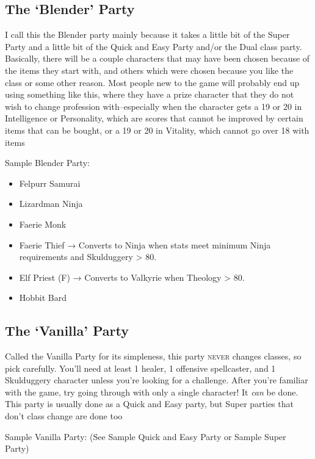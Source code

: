 \documentclass[12pt]{article}
\providecommand{\tightlist}{%
  \setlength{\itemsep}{0pt}\setlength{\parskip}{0pt}}
\begin{document}
\subsection{\texorpdfstring{The `Blender'
Party}{The Blender Party}}\label{the-blender-party}

I call this the Blender party mainly because it takes a little bit of
the Super Party and a little bit of the Quick and Easy Party and/or the
Dual class party. Basically, there will be a couple characters that may
have been chosen because of the items they start with, and others which
were chosen because you like the class or some other reason. Most people
new to the game will probably end up using something like this, where
they have a prize character that they do not wish to change profession
with--especially when the character gets a 19 or 20 in Intelligence or
Personality, which are scores that cannot be improved by certain items
that can be bought, or a 19 or 20 in Vitality, which cannot go over 18
with items

Sample Blender Party:

\begin{itemize}
\tightlist
\item
  Felpurr Samurai
\item
  Lizardman Ninja
\item
  Faerie Monk
\item
  Faerie Thief → Converts to Ninja when stats meet minimum Ninja
  requirements and Skulduggery \textgreater{} 80.
\item
  Elf Priest (F) → Converts to Valkyrie when Theology \textgreater{} 80.
\item
  Hobbit Bard
\end{itemize}

\subsection{\texorpdfstring{The `Vanilla'
Party}{The Vanilla Party}}\label{the-vanilla-party}

Called the Vanilla Party for its simpleness, this party \textsc{never}
changes classes, so pick carefully. You'll need at least 1 healer, 1
offensive spellcaster, and 1 Skulduggery character unless you're looking for
a challenge. After you're familiar with the game, try going through with only
a single character! It \emph{can} be done. This party is usually done as a
Quick and Easy party, but Super parties that don't class change are done too

Sample Vanilla Party: (See Sample Quick and Easy Party or Sample Super
Party)
\end{document}
